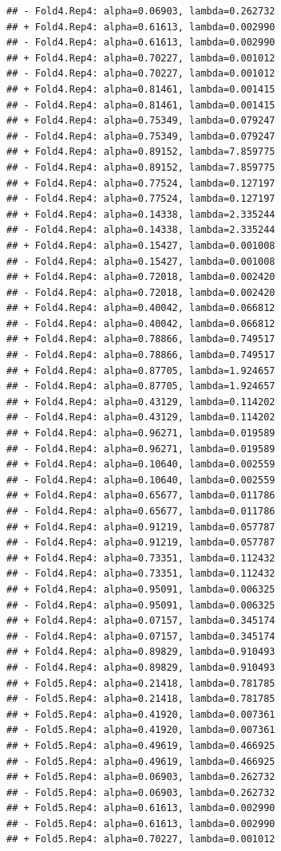 \documentclass[
]{article}
\begin{document}
\begin{verbatim}
## - Fold4.Rep4: alpha=0.06903, lambda=0.262732 
## + Fold4.Rep4: alpha=0.61613, lambda=0.002990 
## - Fold4.Rep4: alpha=0.61613, lambda=0.002990 
## + Fold4.Rep4: alpha=0.70227, lambda=0.001012 
## - Fold4.Rep4: alpha=0.70227, lambda=0.001012 
## + Fold4.Rep4: alpha=0.81461, lambda=0.001415 
## - Fold4.Rep4: alpha=0.81461, lambda=0.001415 
## + Fold4.Rep4: alpha=0.75349, lambda=0.079247 
## - Fold4.Rep4: alpha=0.75349, lambda=0.079247 
## + Fold4.Rep4: alpha=0.89152, lambda=7.859775 
## - Fold4.Rep4: alpha=0.89152, lambda=7.859775 
## + Fold4.Rep4: alpha=0.77524, lambda=0.127197 
## - Fold4.Rep4: alpha=0.77524, lambda=0.127197 
## + Fold4.Rep4: alpha=0.14338, lambda=2.335244 
## - Fold4.Rep4: alpha=0.14338, lambda=2.335244 
## + Fold4.Rep4: alpha=0.15427, lambda=0.001008 
## - Fold4.Rep4: alpha=0.15427, lambda=0.001008 
## + Fold4.Rep4: alpha=0.72018, lambda=0.002420 
## - Fold4.Rep4: alpha=0.72018, lambda=0.002420 
## + Fold4.Rep4: alpha=0.40042, lambda=0.066812 
## - Fold4.Rep4: alpha=0.40042, lambda=0.066812 
## + Fold4.Rep4: alpha=0.78866, lambda=0.749517 
## - Fold4.Rep4: alpha=0.78866, lambda=0.749517 
## + Fold4.Rep4: alpha=0.87705, lambda=1.924657 
## - Fold4.Rep4: alpha=0.87705, lambda=1.924657 
## + Fold4.Rep4: alpha=0.43129, lambda=0.114202 
## - Fold4.Rep4: alpha=0.43129, lambda=0.114202 
## + Fold4.Rep4: alpha=0.96271, lambda=0.019589 
## - Fold4.Rep4: alpha=0.96271, lambda=0.019589 
## + Fold4.Rep4: alpha=0.10640, lambda=0.002559 
## - Fold4.Rep4: alpha=0.10640, lambda=0.002559 
## + Fold4.Rep4: alpha=0.65677, lambda=0.011786 
## - Fold4.Rep4: alpha=0.65677, lambda=0.011786 
## + Fold4.Rep4: alpha=0.91219, lambda=0.057787 
## - Fold4.Rep4: alpha=0.91219, lambda=0.057787 
## + Fold4.Rep4: alpha=0.73351, lambda=0.112432 
## - Fold4.Rep4: alpha=0.73351, lambda=0.112432 
## + Fold4.Rep4: alpha=0.95091, lambda=0.006325 
## - Fold4.Rep4: alpha=0.95091, lambda=0.006325 
## + Fold4.Rep4: alpha=0.07157, lambda=0.345174 
## - Fold4.Rep4: alpha=0.07157, lambda=0.345174 
## + Fold4.Rep4: alpha=0.89829, lambda=0.910493 
## - Fold4.Rep4: alpha=0.89829, lambda=0.910493 
## + Fold5.Rep4: alpha=0.21418, lambda=0.781785 
## - Fold5.Rep4: alpha=0.21418, lambda=0.781785 
## + Fold5.Rep4: alpha=0.41920, lambda=0.007361 
## - Fold5.Rep4: alpha=0.41920, lambda=0.007361 
## + Fold5.Rep4: alpha=0.49619, lambda=0.466925 
## - Fold5.Rep4: alpha=0.49619, lambda=0.466925 
## + Fold5.Rep4: alpha=0.06903, lambda=0.262732 
## - Fold5.Rep4: alpha=0.06903, lambda=0.262732 
## + Fold5.Rep4: alpha=0.61613, lambda=0.002990 
## - Fold5.Rep4: alpha=0.61613, lambda=0.002990 
## + Fold5.Rep4: alpha=0.70227, lambda=0.001012 

\end{verbatim}
\end{document}
